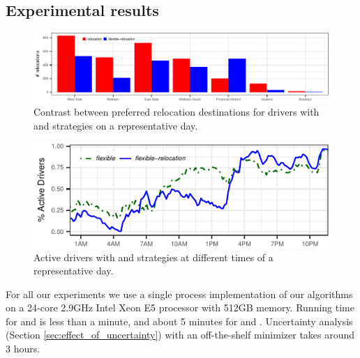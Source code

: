 
\subsection{Experimental results}


\begin{figure}     
	\centering
	\includegraphics{figures/relocation_endzones.pdf}
	\setlength{\belowcaptionskip}{-5pt}
	\caption{Contrast between preferred relocation destinations for
	drivers with {\relocation} and {\relocationflexible} strategies
	on a representative day.}     
	\label{fig:relocation_endzones}
\end{figure}

\begin{figure}[h]
	\centering
	\includegraphics{figures/simulated_schedules.pdf}
	\setlength{\belowcaptionskip}{-10pt}
	\caption{Active drivers with {\flexible} and {\relocationflexible}
	strategies at different times of a representative day.}
	\label{fig:simulated_schedules}
\end{figure}

For all our experiments we use a single process implementation of our algorithms on a 24-core 2.9GHz Intel Xeon E5 processor with 512GB memory. Running time for  {\naive} and {\relocation}  is less than a minute, and about 5 minutes for  {\flexible} and  {\relocationflexible}. 
Uncertainty analysis (Section \ref{sec:effect_of_uncertainty}) with an off-the-shelf minimizer takes around 3 hours.

